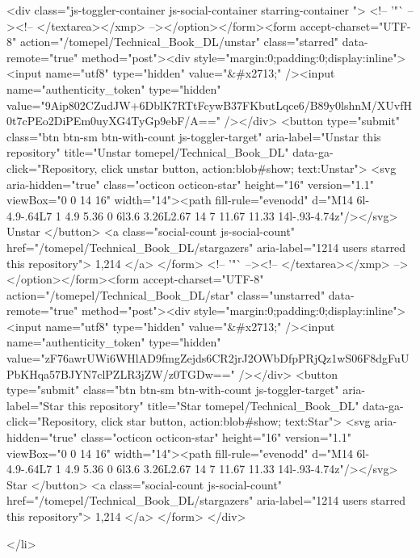   <div class="js-toggler-container js-social-container starring-container ">
    <!-- '"` --><!-- </textarea></xmp> --></option></form><form accept-charset="UTF-8" action="/tomepel/Technical_Book_DL/unstar" class="starred" data-remote="true" method="post"><div style="margin:0;padding:0;display:inline"><input name="utf8" type="hidden" value="&#x2713;" /><input name="authenticity_token" type="hidden" value="9Aip802CZudJW+6DblK7RTtFcywB37FKbutLqce6/B89y0lshnM/XUvfH0t7cPEo2DiPEm0uyXG4TyGp9ebF/A==" /></div>
      <button
        type="submit"
        class="btn btn-sm btn-with-count js-toggler-target"
        aria-label="Unstar this repository" title="Unstar tomepel/Technical_Book_DL"
        data-ga-click="Repository, click unstar button, action:blob#show; text:Unstar">
        <svg aria-hidden="true" class="octicon octicon-star" height="16" version="1.1" viewBox="0 0 14 16" width="14"><path fill-rule="evenodd" d="M14 6l-4.9-.64L7 1 4.9 5.36 0 6l3.6 3.26L2.67 14 7 11.67 11.33 14l-.93-4.74z"/></svg>
        Unstar
      </button>
        <a class="social-count js-social-count" href="/tomepel/Technical_Book_DL/stargazers"
           aria-label="1214 users starred this repository">
          1,214
        </a>
</form>
    <!-- '"` --><!-- </textarea></xmp> --></option></form><form accept-charset="UTF-8" action="/tomepel/Technical_Book_DL/star" class="unstarred" data-remote="true" method="post"><div style="margin:0;padding:0;display:inline"><input name="utf8" type="hidden" value="&#x2713;" /><input name="authenticity_token" type="hidden" value="zF76awrUWi6WHlAD9fmgZejds6CR2jrJ2OWbDfpPRjQz1wS06F8dgFuUPbKHqa57BJYN7clPZLR3jZW/z0TGDw==" /></div>
      <button
        type="submit"
        class="btn btn-sm btn-with-count js-toggler-target"
        aria-label="Star this repository" title="Star tomepel/Technical_Book_DL"
        data-ga-click="Repository, click star button, action:blob#show; text:Star">
        <svg aria-hidden="true" class="octicon octicon-star" height="16" version="1.1" viewBox="0 0 14 16" width="14"><path fill-rule="evenodd" d="M14 6l-4.9-.64L7 1 4.9 5.36 0 6l3.6 3.26L2.67 14 7 11.67 11.33 14l-.93-4.74z"/></svg>
        Star
      </button>
        <a class="social-count js-social-count" href="/tomepel/Technical_Book_DL/stargazers"
           aria-label="1214 users starred this repository">
          1,214
        </a>
</form>  </div>

  </li>

